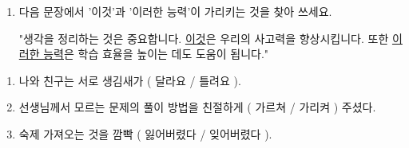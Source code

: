 \documentclass[fs11,seriesFre]{korfarm-base}
\begin{document}
\kfActivityBg {}
\par{}\par\nopagebreak[4]\smallskip\nopagebreak[4]
\begin{enumerate}[leftmargin=22pt, itemsep=6pt, topsep=4pt, label=\textbf{\arabic*.}]
\item 다음 문장에서 '이것'과 '이러한 능력'이 가리키는 것을 찾아 쓰세요.
\begin{kfEvidence}"생각을 정리하는 것은 중요합니다. \uline{이것}은 우리의 사고력을 향상시킵니다. 또한 \uline{이러한 능력}은 학습 효율을 높이는 데도 도움이 됩니다."\end{kfEvidence}
\end{enumerate}

\kfActivityBg {}
\par{}\par\nopagebreak[4]\smallskip\nopagebreak[4]
\begin{enumerate}[leftmargin=22pt, itemsep=6pt, topsep=4pt, label=\textbf{\arabic*.}]
\item 나와 친구는 서로 생김새가 ( 달라요 / 틀려요 ).
\item 선생님께서 모르는 문제의 풀이 방법을 친절하게 ( 가르쳐 / 가리켜 ) 주셨다.
\item 숙제 가져오는 것을 깜빡 ( 잃어버렸다 / 잊어버렸다 ).
\end{enumerate}

\end{document}
